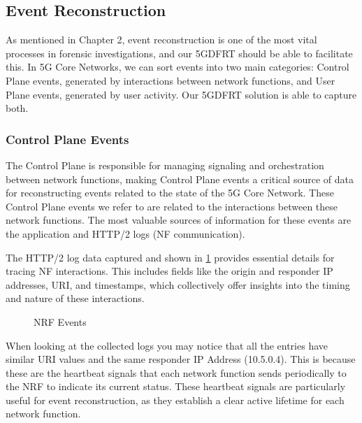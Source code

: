 \documentclass[final,1p,times,authoryear]{elsarticle}
\begin{document}
\subsection{Event Reconstruction}
\label{sub4sec2}
As mentioned in Chapter 2, event reconstruction is one of the most vital processes in forensic investigations, and our 5GDFRT should be able to facilitate this. In 5G Core Networks, we can sort events into two main categories: Control Plane events, generated by interactions between network functions, and User Plane events, generated by user activity. Our 5GDFRT solution is able to capture both.

\subsubsection{Control Plane Events}
\label{sub4sub2sec1}
The Control Plane is responsible for managing signaling and orchestration between network functions, making Control Plane events a critical source of data for reconstructing events related to the state of the 5G Core Network. These Control Plane events we refer to are related to the interactions between these network functions. The most valuable sources of information for these events are the application and HTTP/2 logs (NF communication).

\vspace{1em}

The HTTP/2 log data captured and shown in \ref{fig:nrf-events} provides essential details for tracing NF interactions. This includes fields like the origin and responder IP addresses, URI, and timestamps, which collectively offer insights into the timing and nature of these interactions.

\begin{figure}[H]
  \centering
  \caption{NRF Events}
  \label{fig:nrf-events}
\end{figure}

When looking at the collected logs you may notice that all the entries have similar URI values and the same responder IP Address (10.5.0.4). This is because these are the heartbeat signals that each network function sends periodically to the NRF to indicate its current status. These heartbeat signals are particularly useful for event reconstruction, as they establish a clear active lifetime for each network function.
\end{document}

